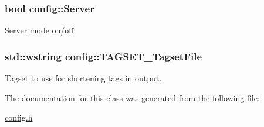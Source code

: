 \subsubsection[{Server}]{\setlength{\rightskip}{0pt plus 5cm}bool config\+::\+Server}\label{classconfig_a8868de72bdafb627b21b7f20e16ebf9e}


Server mode on/off. 

\hypertarget{classconfig_a6f42f7c1c60685d9b223fa9dc717a947}{}
\subsubsection[{T\+A\+G\+S\+E\+T\+\_\+\+Tagset\+File}]{\setlength{\rightskip}{0pt plus 5cm}std\+::wstring config\+::\+T\+A\+G\+S\+E\+T\+\_\+\+Tagset\+File}\label{classconfig_a6f42f7c1c60685d9b223fa9dc717a947}


Tagset to use for shortening tags in output. 



The documentation for this class was generated from the following file\+:\begin{DoxyCompactItemize}
\item 
\hyperlink{config_8h}{config.\+h}\end{DoxyCompactItemize}

